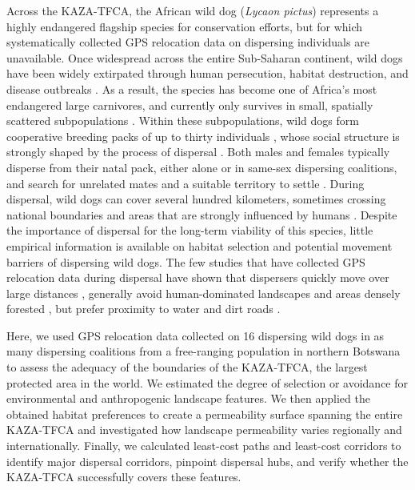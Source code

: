 \documentclass[abstract=on,10pt,a4paper,bibliography=totocnumbered]{article}
\begin{document}
Across the KAZA-TFCA, the African wild dog (\textit{Lycaon pictus}) represents a
highly endangered flagship species for conservation efforts, but for which
systematically collected GPS relocation data on dispersing individuals are
unavailable. Once widespread across the entire Sub-Saharan continent, wild
dogs have been widely extirpated through human persecution, habitat destruction,
and disease outbreaks \citep{Woodroffe.2012}. As a result, the species has
become one of Africa's most endangered large carnivores, and currently only
survives in small, spatially scattered subpopulations \citep{Woodroffe.2012}.
Within these subpopulations, wild dogs form cooperative breeding packs of up to
thirty individuals \citep{Frame.1979, Fuller.1992, Creel.2002}, whose social
structure is strongly shaped by the process of dispersal \citep{McNutt.1996,
Woodroffe.2019, Behr.2020}. Both males and females typically disperse from their
natal pack, either alone or in same-sex dispersing coalitions, and search for
unrelated mates and a suitable territory to settle \citep{McNutt.1996,
Cozzi.2020, Behr.2020}. During dispersal, wild dogs can cover several hundred
kilometers, sometimes crossing national boundaries and areas that are strongly
influenced by humans \citep{DaviesMostert.2012, Masenga.2016, Woodroffe.2019,
Cozzi.2020}. Despite the importance of dispersal for the long-term viability of
this species, little empirical information is available on habitat selection and
potential movement barriers of dispersing wild dogs. The few studies that have
collected GPS relocation data during dispersal have shown that dispersers
quickly move over large distances \citep{Woodroffe.2019}, generally avoid
human-dominated landscapes \citep{Masenga.2016, Oneill.2020, Cozzi.2020} and
areas densely forested \citep{Oneill.2020}, but prefer proximity to water and
dirt roads \citep{Oneill.2020}.

Here, we used GPS relocation data collected on 16 dispersing wild dogs in as
many dispersing coalitions from a free-ranging population in northern Botswana
to assess the adequacy of the boundaries of the KAZA-TFCA, the largest protected
area in the world. We estimated the degree of selection or avoidance for
environmental and anthropogenic landscape features. We then applied the obtained
habitat preferences to create a permeability surface spanning the entire
KAZA-TFCA and investigated how landscape permeability varies regionally and
internationally. Finally, we calculated least-cost paths and least-cost
corridors to identify major dispersal corridors, pinpoint dispersal hubs, and
verify whether the KAZA-TFCA successfully covers these features.
\end{document}
